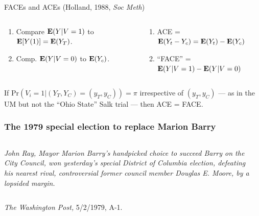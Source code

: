 \begin{frame}[shrink]{FACEs and ACEs (Holland, 1988, \textit{Soc
      Meth}) }



\begin{columns}
  \begin{column}{.45\linewidth}
  \begin{enumerate}[<+->]
  \item   Compare $\mathbf{E}(Y | V=1)$ to $\mathbf{E}[Y(1)]= \mathbf{E}(Y_{T})$.  
\item Comp.  $\mathbf{E}(Y | V=0)$ to $\mathbf{E}(Y_{c})$.
\end{enumerate}    
\end{column}
\begin{column}{.55\linewidth}
\begin{enumerate}[<+->]
\item ACE = $\mathbf{E}(Y_t - Y_c) = \mathbf{E}(Y_{t}) - \mathbf{E}(Y_{c})$
\item ``FACE'' = $\mathbf{E}(Y | V=1) - \mathbf{E}(Y | V=0)$
\end{enumerate}
\end{column}
\end{columns}


\pause
 If $\mathrm{Pr}(V_{i}=1 | (Y_{T}, Y_{C})=(y_{T}, y_{C})) = \pi$
  irrespective of $(y_{T}, y_{C}) $ --- as in the UM but not the
  ``Ohio State'' Salk trial  --- then ACE = FACE.  



\end{frame}



\begin{frame} \frametitle{The 1979 special election to replace Marion
    Barry}
  \begin{columns}
    \begin{column}{0.6\linewidth}

      \textit{
        John Ray, Mayor Marion Barry's handpicked choice to succeed Barry on the City Council, won yesterday's special District of Columbia election, defeating his nearest rival, controversial former council member Douglas E. Moore, by a lopsided margin.
      }
\vfill

    \end{column}
    \begin{column}{0.4\linewidth}
       \vfill

    \end{column}
  \end{columns}
\bigskip

\textit{The Washington Post,} 5/2/1979, A-1.
\end{frame}

